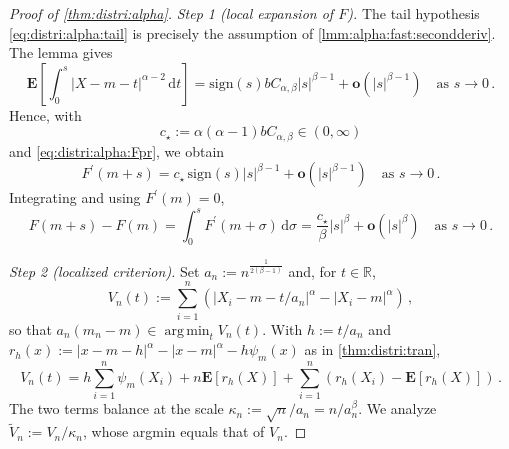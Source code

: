 \documentclass{article}
\newcommand*{\mo}[1]{\mathbf{#1}}
\newcommand{\R}{\mathbb{R}}
\newcommand{\lab}{\left[} %
\newcommand{\rab}{\right]} %
\newcommand{\ab}[1]{\lab #1 \rab} %
\newcommand{\abOf}[1]{\!\ab{#1}} %
\newcommand{\lb}{\left(} %
\newcommand{\rb}{\right)} %
\newcommand{\br}[1]{\lb #1 \rb} %
\newcommand{\brOf}[1]{\!\br{#1}} %
\newcommand{\E}{\mathbf{E}} %
\newcommand{\Eof}[1]{\E[#1]}
\newcommand{\EOf}[1]{\E\abOf{#1}}
\newcommand{\pr}{^\prime}
\newcommand{\eqcm}{\,,} %
\newcommand{\eqfs}{\,.}
\newcommand{\dl}{\mathrm{d}} %
\DeclareMathOperator*{\argmin}{arg\,min}
\newcommand{\sign}{\mathrm{sign}}
\begin{document}
\begin{proof}[Proof of \cref{thm:distri:alpha}]
    \emph{Step 1 (local expansion of $F$).}
    The tail hypothesis \eqref{eq:distri:alpha:tail} is precisely the assumption of \cref{lmm:alpha:fast:secondderiv}. The lemma gives
    \begin{equation}
        \EOf{\int_0^s |X-m-t|^{\alpha-2}\,\dl t}
        =
        \sign(s) b C_{\alpha,\beta} |s|^{\beta-1}+\mo o\brOf{|s|^{\beta-1}}
        \quad\text{as }s\to0
        \eqfs
    \end{equation}
    Hence, with
    \begin{equation}\label{eq:alpha:cstar}
        c_\star:=\alpha(\alpha-1) b C_{\alpha,\beta}\in(0,\infty)
    \end{equation}
    and \eqref{eq:distri:alpha:Fpr}, we obtain 
    \begin{equation}\label{eq:alpha:Phi}
        F\pr(m+s)=c_\star\,\sign(s) |s|^{\beta-1}+\mo o\brOf{|s|^{\beta-1}}
        \quad\text{as }s\to0
        \eqfs
    \end{equation}
    Integrating and using $F\pr(m)=0$,
    \begin{equation}\label{eq:alpha:F:expansion}
        F(m+s)-F(m)
        =\int_0^s F\pr(m+\sigma)\,\dl\sigma
        =\frac{c_\star}{\beta} |s|^{\beta}+\mo o\brOf{|s|^{\beta}}
        \quad\text{as }s\to0
        \eqfs
    \end{equation}
    
    \emph{Step 2 (localized criterion).}
    Set $a_n:=n^{\frac1{2(\beta-1)}}$ and, for $t\in\R$,
    \begin{equation}
        V_n(t):=\sum_{i=1}^n
        \brOf{|X_i-m-t/a_n|^\alpha-|X_i-m|^\alpha}
        \eqcm
    \end{equation}
    so that $a_n(m_n-m)\in\argmin_{t}V_n(t)$. With $h:=t/a_n$ and
    $r_h(x):=|x-m-h|^\alpha-|x-m|^\alpha-h\psi_m(x)$ as in
    \cref{thm:distri:tran},
    \begin{equation}
        V_n(t)
        =h\sum_{i=1}^n\psi_m(X_i)
        +n\Eof{r_h(X)}
        +\sum_{i=1}^n\brOf{r_h(X_i)-\Eof{r_h(X)}}
        \eqfs
    \end{equation}
    The two terms balance at the scale
    $\kappa_n:=\sqrt n/a_n=n/a_n^{\beta}$. We analyze $\tilde V_n:=V_n/\kappa_n$, whose argmin
    equals that of $V_n$.
    

\end{proof}
\end{document}

